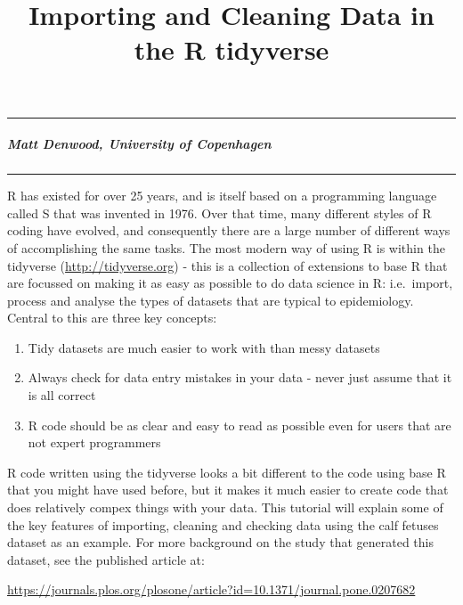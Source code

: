 \documentclass[
]{article}
\title{Importing and Cleaning Data in the R tidyverse}
\author{}
\date{\vspace{-2.5em}}
\providecommand{\tightlist}{%
  \setlength{\itemsep}{0pt}\setlength{\parskip}{0pt}}
\begin{document}
\maketitle

\begin{center}\rule{0.5\linewidth}{0.5pt}\end{center}

\hypertarget{matt-denwood-university-of-copenhagen}{%
\subparagraph{Matt Denwood, University of
Copenhagen}\label{matt-denwood-university-of-copenhagen}}

\begin{center}\rule{0.5\linewidth}{0.5pt}\end{center}

R has existed for over 25 years, and is itself based on a programming
language called S that was invented in 1976. Over that time, many
different styles of R coding have evolved, and consequently there are a
large number of different ways of accomplishing the same tasks. The most
modern way of using R is within the tidyverse
(\url{http://tidyverse.org}) - this is a collection of extensions to
base R that are focussed on making it as easy as possible to do data
science in R: i.e.~import, process and analyse the types of datasets
that are typical to epidemiology. Central to this are three key
concepts:

\begin{enumerate}
\def\labelenumi{\arabic{enumi})}
\tightlist
\item
  Tidy datasets are much easier to work with than messy datasets
\item
  Always check for data entry mistakes in your data - never just assume
  that it is all correct
\item
  R code should be as clear and easy to read as possible even for users
  that are not expert programmers
\end{enumerate}

R code written using the tidyverse looks a bit different to the code
using base R that you might have used before, but it makes it much
easier to create code that does relatively compex things with your data.
This tutorial will explain some of the key features of importing,
cleaning and checking data using the calf fetuses dataset as an example.
For more background on the study that generated this dataset, see the
published article at:

\url{https://journals.plos.org/plosone/article?id=10.1371/journal.pone.0207682}
\end{document}
